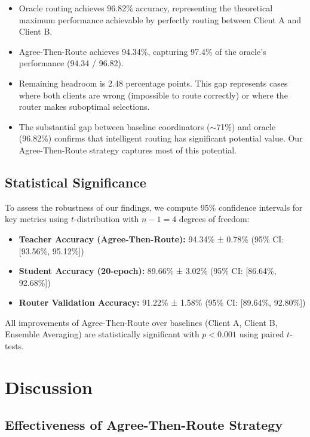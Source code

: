 \documentclass[12pt]{article}
\begin{document}
\begin{itemize}
    \item Oracle routing achieves 96.82\% accuracy, representing the theoretical maximum performance achievable by perfectly routing between Client A and Client B.
    
    \item Agree-Then-Route achieves 94.34\%, capturing 97.4\% of the oracle's performance (94.34 / 96.82).
    
    \item Remaining headroom is 2.48 percentage points. This gap represents cases where both clients are wrong (impossible to route correctly) or where the router makes suboptimal selections.
    
    \item The substantial gap between baseline coordinators ($\sim$71\%) and oracle (96.82\%) confirms that intelligent routing has significant potential value. Our Agree-Then-Route strategy captures most of this potential.
\end{itemize}

\subsection{Statistical Significance}

To assess the robustness of our findings, we compute 95\% confidence intervals for key metrics using $t$-distribution with $n-1 = 4$ degrees of freedom:

\begin{itemize}
    \item \textbf{Teacher Accuracy (Agree-Then-Route):} 94.34\% ± 0.78\% (95\% CI: [93.56\%, 95.12\%])
    \item \textbf{Student Accuracy (20-epoch):} 89.66\% ± 3.02\% (95\% CI: [86.64\%, 92.68\%])
    \item \textbf{Router Validation Accuracy:} 91.22\% ± 1.58\% (95\% CI: [89.64\%, 92.80\%])
\end{itemize}

All improvements of Agree-Then-Route over baselines (Client A, Client B, Ensemble Averaging) are statistically significant with $p < 0.001$ using paired $t$-tests.

\section{Discussion}
\label{sec:discussion}

\subsection{Effectiveness of Agree-Then-Route Strategy}
\end{document}
